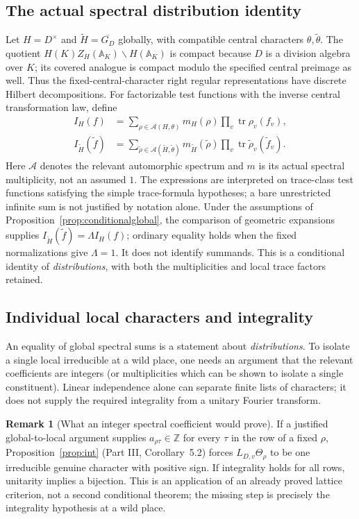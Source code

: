 \documentclass[11pt]{article}
\newcommand{\A}{\mathbb A}
\newcommand{\GDb}{\overline{G_D}}
\theoremstyle{plain}
\theoremstyle{definition}
\newtheorem{remark}[theorem]{Remark}
\begin{document}
\subsection{The actual spectral distribution identity}
Let $H=D^\times$ and $\widetilde H=\GDb$ globally, with
compatible central characters $\theta,\widetilde\theta$.
The quotient $H(K)Z_H(\A_K)\backslash H(\A_K)$ is compact
because $D$ is a division algebra over $K$; its covered analogue
is compact modulo the specified central preimage as well.
Thus the fixed-central-character right regular representations
have discrete Hilbert decompositions.  For factorizable test
functions with the inverse central transformation law, define
\begin{align}
 I_H(f)&=\sum_{\rho\in\mathcal A(H,\theta)}
       m_H(\rho)\prod_v\operatorname{tr}\rho_v(f_v),\\
 I_{\widetilde H}(\widetilde f)
     &=\sum_{\widetilde\rho\in\mathcal A(\widetilde H,\widetilde\theta)}
       m_{\widetilde H}(\widetilde\rho)
       \prod_v\operatorname{tr}\widetilde\rho_v(\widetilde f_v).
       \label{eq:spectralglobal}
\end{align}
Here $\mathcal A$ denotes the relevant automorphic spectrum
and $m$ is its actual spectral multiplicity, not an assumed $1$.
The expressions are interpreted on trace-class test functions
satisfying the simple trace-formula hypotheses; a bare
unrestricted infinite sum is not justified by notation alone.
Under the assumptions of Proposition~\ref{prop:conditionalglobal},
the comparison of geometric expansions supplies
$I_{\widetilde H}(\widetilde f)=\Lambda I_H(f)$;
ordinary equality holds when the fixed normalizations give
$\Lambda=1$.  It does not
identify summands.  This is a conditional identity of
\emph{distributions}, with both the multiplicities and local
trace factors retained.

\subsection{Individual local characters and integrality}
An equality of global spectral sums is a statement about
\emph{distributions}.  To isolate a single local irreducible at a
wild place, one needs an argument that the relevant coefficients
are integers (or multiplicities which can be shown to isolate a
single constituent).  Linear independence alone can separate
finite lists of characters; it does not supply the required
integrality from a unitary Fourier transform.

\begin{remark}[What an integer spectral coefficient would prove]
If a justified global-to-local argument supplies
$a_{\rho\tau}\in\mathbb Z$ for every $\tau$ in the row of a fixed
$\rho$, Proposition~\ref{prop:int} (Part III, Corollary~5.2)
forces $L_{D,v}\Theta_\rho$ to be one irreducible genuine
character with positive sign.  If integrality holds for all
rows, unitarity implies a bijection.  This is an application of
an already proved lattice criterion, not a second conditional
theorem; the missing step is precisely the integrality
hypothesis at a wild place.
\end{remark}
\end{document}
